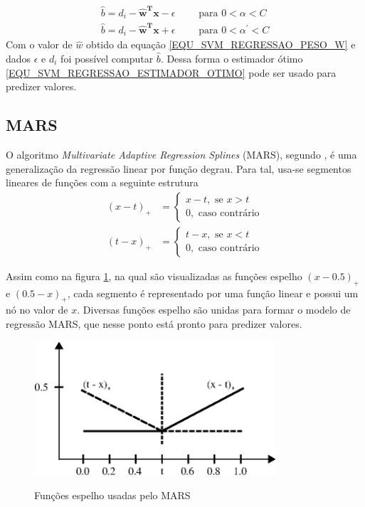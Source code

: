 \begin{align}
\hat{b} = d_{i} - \mathbf{\hat{w}^{T}x} -\epsilon	\qquad \textrm{ para } 0 < \alpha < C		\label{EQU_SVM_REGRESSAO_CONDICAO6}\\
\hat{b} = d_{i} - \mathbf{\hat{w}^{T}x} +\epsilon	\qquad \textrm{ para }  0 < \alpha^{'} < C	\label{EQU_SVM_REGRESSAO_CONDICAO7}
\end{align}
Com o valor de \(\hat{w}\) obtido da equação \eqref{EQU_SVM_REGRESSAO_PESO_W} e dados \(\epsilon\) e \(d_{i}\) foi possível computar \(\hat{b}\). Dessa forma o estimador ótimo \eqref{EQU_SVM_REGRESSAO_ESTIMADOR_OTIMO} pode ser usado para predizer valores.

\subsection{MARS}
O algoritmo \emph{Multivariate Adaptive Regression Splines} (MARS), segundo , é uma generalização da regressão linear por função degrau. Para tal, usa-se segmentos lineares de funções com a seguinte estrutura
\begin{align}
(x-t)_{+} &= \begin{cases}
x-t, \textrm{ se } x > t \\
0,   \textrm{ caso contrário}
\end{cases}
\\
(t-x)_{+} &= \begin{cases}
t-x, \textrm{ se } x < t \\
0, \textrm{ caso contrário}
\end{cases} 
\end{align}

Assim como na figura \ref{FIGURA_MARS_FUNCAO_ESPELHO}, na qual são visualizadas as funções espelho \((x-0.5)_{+}\) e \((0.5-x)_{+}\), cada segmento é representado por uma função linear e possui um nó no valor de \(x\). Diversas funções espelho são unidas para formar o modelo de regressão MARS, que nesse ponto está pronto para predizer valores.

\begin{figure}[hbt]
	\centering
 	  \caption{Funções espelho usadas pelo MARS}
		\includegraphics[width=9cm,height=5cm]{./secoes/conceitosFundamentais/pics/img/FuncaoEspelhoMARS.eps}
	\label{FIGURA_MARS_FUNCAO_ESPELHO}
\end{figure}

